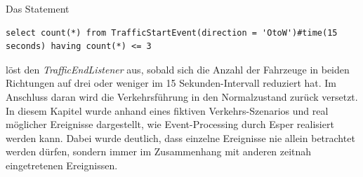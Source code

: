Das Statement 

\begin{lstlisting}
select count(*) from TrafficStartEvent(direction = 'OtoW')#time(15 seconds) having count(*) <= 3
\end{lstlisting}

löst den \textit{TrafficEndListener} aus, sobald sich die Anzahl der Fahrzeuge in beiden Richtungen auf drei oder weniger im 15 Sekunden-Intervall reduziert hat. Im Anschluss daran wird die Verkehrsführung in den Normalzustand zurück versetzt.\\

In diesem Kapitel wurde anhand eines fiktiven Verkehrs-Szenarios und real möglicher Ereignisse dargestellt, wie Event-Processing durch Esper realisiert werden kann. Dabei wurde deutlich, dass einzelne Ereignisse nie allein betrachtet werden dürfen, sondern immer im Zusammenhang mit anderen zeitnah eingetretenen Ereignissen.


\clearpage
